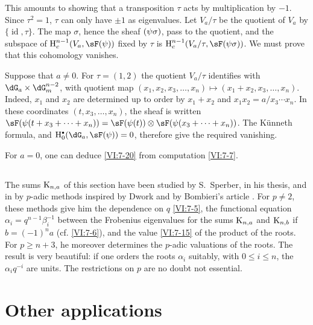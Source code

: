 This amounts to showing that a transposition $\tau$ acts by multiplication
by $-1$. Since $\tau^2=1$, $\tau$ can only have $\pm 1$ as eigenvalues.
Let $V_a/\tau$ be the quotient of $V_a$ by
$\{\operatorname{id},\tau\}$. The map $\sigma$, hence the sheaf
$\sf(\psi\sigma)$, pass to the quotient, and the subspace of
$\h_c^{n-1}(V_a,\sF(\psi))$ fixed by
$\tau$ is $\h_c^{n-1}(V_a/\tau,\sF(\psi\sigma))$. We must prove that
this cohomology vanishes.

Suppose that $a\ne 0$. For $\tau=(1,2)$ the quotient $V_a/\tau$ identifies
with $\dG_a\times \dG_m^{n-2}$, with quotient map
$(x_1,x_2,x_3,\dots,x_n)\mapsto (x_1+x_2,x_3,\dots,x_n)$. Indeed, $x_1$ and
$x_2$ are determined up to order by $x_1+x_2$ and
$x_1x_2 = a/x_3\dotsm x_n$. In these coordinates $(t,x_3,\dots,x_n)$, the
sheaf is written
$\sF(\psi(t+x_3+\cdots + x_n)) = \sF(\psi(t))\otimes \sF(\psi(x_3+\cdots + x_n))$.
The K\"unneth formula, and $\h_0^\bullet(\dG_a,\sF(\psi)) = 0$, therefore
give the required vanishing.

For $a=0$, one can deduce \ref{VI:7-20} from computation \ref{VI:7-7}. 





\subsection{}\label{VI:7-21}

The sums $\textnormal{K}_{n,a}$ of this section have been studied by
S.\ Sperber, in his thesis, and in \cite{sp77} by $p$-adic
methods inspired by Dwork and by Bombieri's article \cite{bo66}.
For $p\ne 2$, these methods give him the dependence on $q$ \ref{VI:7-5},
the functional equation $\alpha_i = q^{n-1} \beta_i^{-1}$ between the
Frobenius eigenvalues for the sums $\textnormal{K}_{n,a}$ and
$\textnormal{K}_{n,b}$ if $b=(-1)^n a$ (cf. \ref{VI:7-6}), and the value \ref{VI:7-15}
of the product of the roots. For $p\geqslant n+3$, he moreover determines the
$p$-adic valuations of the roots. The result is very beautiful: if one orders
the roots $\alpha_i$ suitably, with
$0\leqslant i\leqslant n$, the $\alpha_i q^{-i}$ are units. The
restrictions on $p$ are no doubt not essential. 










\section{Other applications}\label{VI:8}





